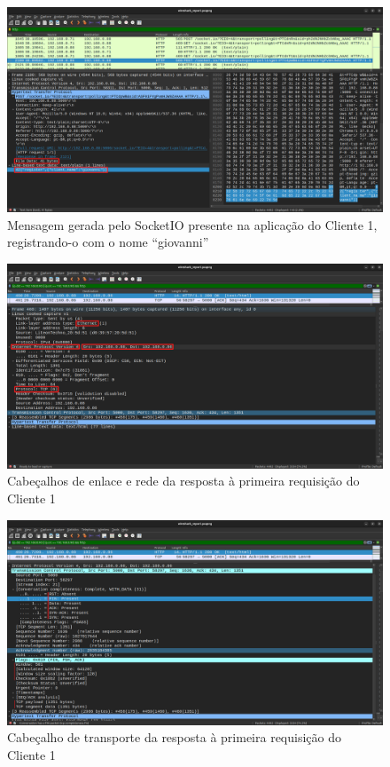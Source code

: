 \documentclass[conference,compsoc]{IEEEtran}
\begin{document}
\begin{otherlanguage}{brazil}
\begin{figure}[!h]
\centering
\includegraphics[width=\columnwidth]{../media/04-register.png}
\caption{Mensagem gerada pelo SocketIO presente na aplicação do Cliente 1, registrando-o com o nome ``giovanni''}
\label{fig:socketio_register}
\end{figure}

\begin{figure}[!h]
\centering
\includegraphics[width=\columnwidth]{../media/05-server_link_network.png}
\caption{Cabeçalhos de enlace e rede da resposta à primeira requisição do Cliente 1}
\label{fig:link_network_headers}
\end{figure}

\begin{figure}[!h]
\centering
\includegraphics[width=\columnwidth]{../media/06-server_transport.png}
\caption{Cabeçalho de transporte da resposta à primeira requisição do Cliente 1}
\label{fig:transport_header}
\end{figure}


\end{otherlanguage}
\end{document}
